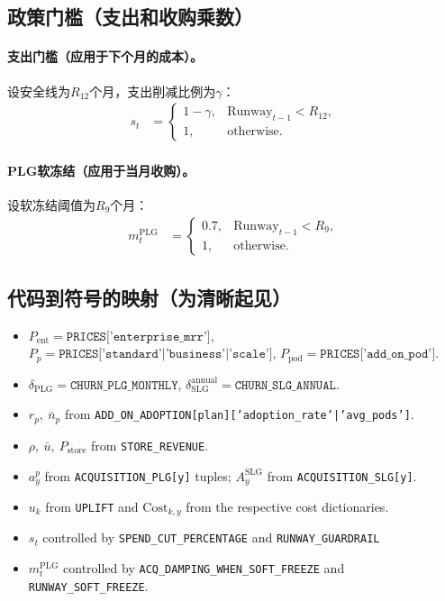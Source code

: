 \documentclass[11pt, a4paper, oneside]{article}
\begin{document}
\subsection{政策门槛（支出和收购乘数）}
\paragraph{支出门槛（应用于下个月的成本）。}
设安全线为$R_{12}$个月，支出削减比例为$\gamma$：
\begin{align}
s_t 
  &= 
  \begin{cases}
    1-\gamma, & \mathrm{Runway}_{t-1} < R_{12},\\
    1, & \text{otherwise.}
  \end{cases}
\end{align}

\paragraph{PLG软冻结（应用于当月收购）。}
设软冻结阈值为$R_{9}$个月：
\begin{align}
m^{\mathrm{PLG}}_t 
  &= 
  \begin{cases}
    0.7, & \mathrm{Runway}_{t-1} < R_{9},\\
    1, & \text{otherwise.}
  \end{cases}
\end{align}

\subsection{代码到符号的映射（为清晰起见）}
\begin{itemize}
  \item $P_{\mathrm{ent}} = \texttt{PRICES['enterprise\_mrr']}$, $P_p=\texttt{PRICES['standard'|'business'|'scale']}$, $P_{\mathrm{pod}}=\texttt{PRICES['add\_on\_pod']}$.
  \item $\delta_{\mathrm{PLG}}=\texttt{CHURN\_PLG\_MONTHLY}$, $\delta^{\mathrm{annual}}_{\mathrm{SLG}}=\texttt{CHURN\_SLG\_ANNUAL}$.
  \item $r_p,\ \bar{n}_p$ from \texttt{ADD\_ON\_ADOPTION[plan]['adoption\_rate'|'avg\_pods']}.
  \item $\rho,\ \bar{u},\ P_{\mathrm{store}}$ from \texttt{STORE\_REVENUE}.
  \item $a^p_y$ from \texttt{ACQUISITION\_PLG[y]} tuples; $A^{\mathrm{SLG}}_y$ from \texttt{ACQUISITION\_SLG[y]}.
  \item $u_k$ from \texttt{UPLIFT} and $\mathrm{Cost}_{k,y}$ from the respective cost dictionaries.
  \item $s_t$ controlled by \texttt{SPEND\_CUT\_PERCENTAGE} and \texttt{RUNWAY\_GUARDRAIL}
  \item $m^{\mathrm{PLG}}_t$ controlled by \texttt{ACQ\_DAMPING\_WHEN\_SOFT\_FREEZE} and \texttt{RUNWAY\_SOFT\_FREEZE}.
\end{itemize}
\end{document}

